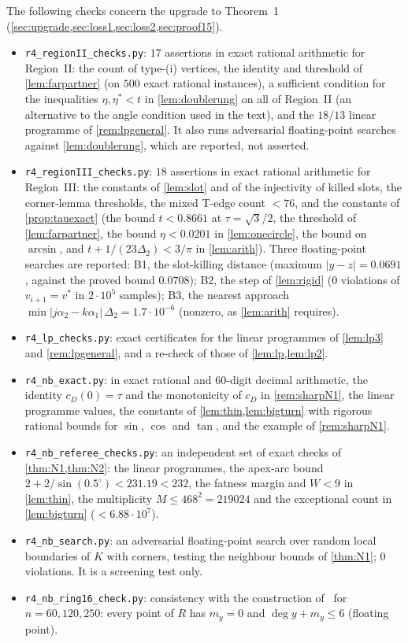 \documentclass[11pt]{amsart}
\theoremstyle{definition}
\theoremstyle{remark}
\newcommand{\Dt}{\Delta_2}
\begin{document}
The following checks concern the upgrade to Theorem~1 (\cref{sec:upgrade,sec:loss1,sec:loss2,sec:proof15}).
\begin{itemize}[leftmargin=2em]
\item \texttt{r4\_regionII\_checks.py}: $17$ assertions in exact rational arithmetic for Region~II: the count of type-(i) vertices, the identity and threshold of \cref{lem:farpartner} (on $500$ exact rational instances), a sufficient condition for the inequalities $\eta,\eta^*<t$ in \cref{lem:doublerung} on all of Region~II (an alternative to the angle condition used in the text), and the $18/13$ linear programme of \cref{rem:lpgeneral}. It also runs adversarial floating-point searches against \cref{lem:doublerung}, which are reported, not asserted.
\item \texttt{r4\_regionIII\_checks.py}: $18$ assertions in exact rational arithmetic for Region~III: the constants of \cref{lem:slot} and of the injectivity of killed slots, the corner-lemma thresholds, the mixed T-edge count $<76$, and the constants of \cref{prop:tauexact} (the bound $t<0.8661$ at $\tau=\sqrt3/2$, the threshold of \cref{lem:farpartner}, the bound $\eta<0.0201$ in \cref{lem:onecircle}, the bound on $\arcsin$, and $t+1/(23\Dt)<3/\pi$ in \cref{lem:arith}). Three floating-point searches are reported: B1, the slot-killing distance (maximum $|y-z|=0.0691$, against the proved bound $0.0708$); B2, the step of \cref{lem:rigid} ($0$ violations of $v_{i+1}=v^*$ in $2\cdot10^5$ samples); B3, the nearest approach $\min|j\alpha_2-k\alpha_1|\,\Dt=1.7\cdot10^{-6}$ (nonzero, as \cref{lem:arith} requires).
\item \texttt{r4\_lp\_checks.py}: exact certificates for the linear programmes of \cref{lem:lp3} and \cref{rem:lpgeneral}, and a re-check of those of \cref{lem:lp,lem:lp2}.
\item \texttt{r4\_nb\_exact.py}: in exact rational and $60$-digit decimal arithmetic, the identity $c_D(0)=\tau$ and the monotonicity of $c_D$ in \cref{rem:sharpN1}, the linear programme values, the constants of \cref{lem:thin,lem:bigturn} with rigorous rational bounds for $\sin$, $\cos$ and $\tan$, and the example of \cref{rem:sharpN1}.
\item \texttt{r4\_nb\_referee\_checks.py}: an independent set of exact checks of \cref{thm:N1,thm:N2}: the linear programmes, the apex-arc bound $2+2/\sin(0.5^\circ)<231.19<232$, the fatness margin and $W<9$ in \cref{lem:thin}, the multiplicity $M\le468^2=219024$ and the exceptional count in \cref{lem:bigturn} ($<6.88\cdot10^7$).
\item \texttt{r4\_nb\_search.py}: an adversarial floating-point search over random local boundaries of $K$ with corners, testing the neighbour bounds of \cref{thm:N1}; $0$ violations. It is a screening test only.
\item \texttt{r4\_nb\_ring16\_check.py}: consistency with the construction of~\cite{ienjoymath} for $n=60,120,250$: every point of $R$ has $m_y=0$ and $\deg y+m_y\le6$ (floating point).
\end{itemize}
\end{document}
